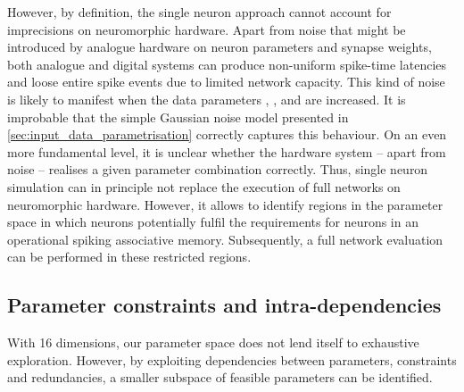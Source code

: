 However, by definition, the single neuron approach cannot account for imprecisions on neuromorphic hardware. Apart from noise that might be introduced by analogue hardware on neuron parameters and synapse weights, both analogue and digital systems can produce non-uniform spike-time latencies and loose entire spike events due to limited network capacity. This kind of noise is likely to manifest when the data parameters \dimIn, \dimOut, \nOnesIn and \nOnesOut are increased. It is improbable that the simple Gaussian noise model presented in \cref{sec:input_data_parametrisation} correctly captures this behaviour. On an even more fundamental level, it is unclear whether the hardware system -- apart from noise -- realises a given parameter combination correctly. Thus, single neuron simulation can in principle not replace the execution of full networks on neuromorphic hardware. However, it allows to identify regions in the parameter space in which neurons potentially fulfil the requirements for neurons in an operational \BiNAM spiking associative memory. Subsequently, a full network evaluation can be performed in these restricted regions.

\subsection{Parameter constraints and intra-dependencies}
\label{sec:parameter_normalisation}

With 16 dimensions, our parameter space does not lend itself to exhaustive exploration. However, by exploiting dependencies between parameters, constraints and redundancies, a smaller subspace of feasible parameters can be identified.

